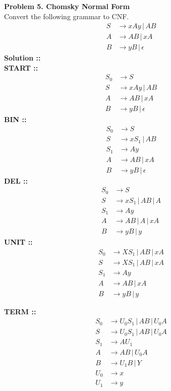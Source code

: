 \documentclass[11pt]{article}
\begin{document}

\textbf{Problem 5. Chomsky Normal Form} \\
Convert the following grammar to CNF.
\begin{align*}
    S&\longrightarrow xAy\,|\, AB \\
    A&\longrightarrow AB\,|\, xA \\
    B&\longrightarrow yB\,|\,\epsilon
\end{align*}
\vspace{5px}\textbf{Solution ::} \\
\textbf{START ::}
\begin{align}
    S_0 &\longrightarrow S \\
    S &\longrightarrow xAy\,|\, AB \\
    A&\longrightarrow AB\,|\, xA \\
    B&\longrightarrow yB \,|\,\epsilon
\end{align}
\textbf{BIN ::}
\begin{align}
    S_0&\longrightarrow S \\
    S&\longrightarrow xS_1 \,|\, AB \\
    S_1&\longrightarrow Ay \\
    A&\longrightarrow AB\,|\, xA \\
    B&\longrightarrow yB \,|\,\epsilon
\end{align}
\textbf{DEL ::}
\begin{align}
    S_0&\longrightarrow S \\
    S&\longrightarrow xS_1 \,|\,AB\,|\, A \\
    S_1&\longrightarrow Ay \\
    A&\longrightarrow AB\,|\, A\,|\, xA \\
    B &\longrightarrow yB \,|\, y
\end{align}
\textbf{UNIT ::}
\begin{align}
    S_0&\longrightarrow XS_1\,|\, AB\,|\, xA \\
    S&\longrightarrow XS_1\,|\,AB\,|\,xA \\
    S_1&\longrightarrow Ay \\
    A&\longrightarrow AB \,|\, xA\\
    B&\longrightarrow yB\,|\,y
\end{align}

\pagebreak
\textbf{TERM ::}
\begin{align}
    S_0&\longrightarrow U_0S_1\,|\, AB\,|\, U_0A \\
    S&\longrightarrow U_0S_1\,|\,AB\,|\,U_0A \\
    S_1&\longrightarrow AU_1 \\
    A&\longrightarrow AB\,|\, U_0A \\
    B&\longrightarrow U_1B\,|\, Y \\
    U_0&\longrightarrow x \\
    U_1&\longrightarrow y
\end{align}
\pagebreak
\end{document}
